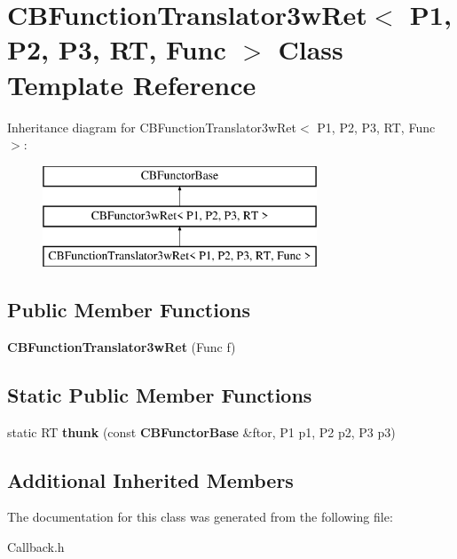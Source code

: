 \section{C\+B\+Function\+Translator3w\+Ret$<$ P1, P2, P3, RT, Func $>$ Class Template Reference}
\label{classCBFunctionTranslator3wRet}
Inheritance diagram for C\+B\+Function\+Translator3w\+Ret$<$ P1, P2, P3, RT, Func $>$\+:\begin{figure}[H]
\begin{center}
\leavevmode
\includegraphics[height=3.000000cm]{classCBFunctionTranslator3wRet}
\end{center}
\end{figure}
\subsection*{Public Member Functions}
\begin{DoxyCompactItemize}
\item 
{\bfseries C\+B\+Function\+Translator3w\+Ret} (Func f)\label{classCBFunctionTranslator3wRet_ac2b6449f80ddab6b24af1d17bf7c7453}

\end{DoxyCompactItemize}
\subsection*{Static Public Member Functions}
\begin{DoxyCompactItemize}
\item 
static RT {\bfseries thunk} (const {\bf C\+B\+Functor\+Base} \&ftor, P1 p1, P2 p2, P3 p3)\label{classCBFunctionTranslator3wRet_a05ba9d1d3e8224bf08097b8dfe9f93cf}

\end{DoxyCompactItemize}
\subsection*{Additional Inherited Members}


The documentation for this class was generated from the following file\+:\begin{DoxyCompactItemize}
\item 
Callback.\+h\end{DoxyCompactItemize}
